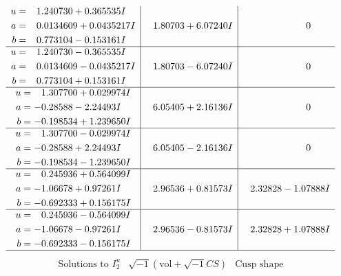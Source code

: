 \documentclass[1p]{elsarticle_modified}
\theoremstyle{definition}
\newcommand{\I}{\sqrt{-1}}
\begin{document}
$$\begin{array}{c|c|c}
\begin{aligned}
u &= \phantom{-}1.240730 + 0.365535 I \\
a &= \phantom{-}0.0134609 + 0.0435217 I \\
b &= \phantom{-}0.773104 - 0.153161 I\end{aligned}
 & \phantom{-}1.80703 + 6.07240 I & \phantom{-0.000000 } 0 \\ \hline\begin{aligned}
u &= \phantom{-}1.240730 - 0.365535 I \\
a &= \phantom{-}0.0134609 - 0.0435217 I \\
b &= \phantom{-}0.773104 + 0.153161 I\end{aligned}
 & \phantom{-}1.80703 - 6.07240 I & \phantom{-0.000000 } 0 \\ \hline\begin{aligned}
u &= \phantom{-}1.307700 + 0.029974 I \\
a &= -0.28588 - 2.24493 I \\
b &= -0.198534 + 1.239650 I\end{aligned}
 & \phantom{-}6.05405 + 2.16136 I & \phantom{-0.000000 } 0 \\ \hline\begin{aligned}
u &= \phantom{-}1.307700 - 0.029974 I \\
a &= -0.28588 + 2.24493 I \\
b &= -0.198534 - 1.239650 I\end{aligned}
 & \phantom{-}6.05405 - 2.16136 I & \phantom{-0.000000 } 0 \\ \hline\begin{aligned}
u &= \phantom{-}0.245936 + 0.564099 I \\
a &= -1.06678 + 0.97261 I \\
b &= -0.692333 + 0.156175 I\end{aligned}
 & \phantom{-}2.96536 + 0.81573 I & \phantom{-}2.32828 - 1.07888 I \\ \hline\begin{aligned}
u &= \phantom{-}0.245936 - 0.564099 I \\
a &= -1.06678 - 0.97261 I \\
b &= -0.692333 - 0.156175 I\end{aligned}
 & \phantom{-}2.96536 - 0.81573 I & \phantom{-}2.32828 + 1.07888 I\\
 \hline 
 \end{array}$$\newpage$$\begin{array}{c|c|c}  
\text{Solutions to }I^u_{2}& \I (\text{vol} + \sqrt{-1}CS) & \text{Cusp shape}\\

\end{array}$$
\end{document}
